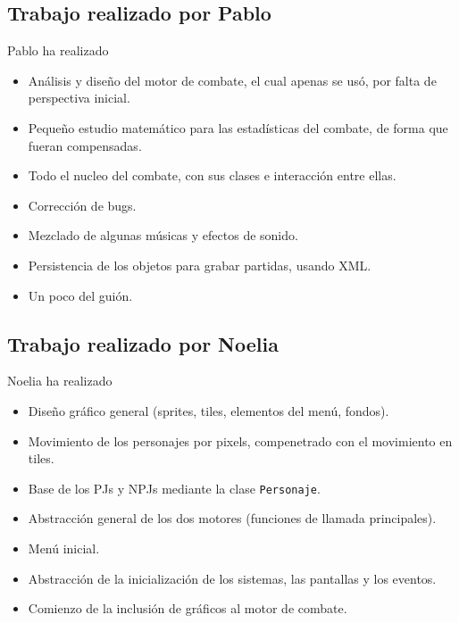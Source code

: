 \documentclass[9pt,xcolor=svgnames]{beamer}
\begin{document}
\subsection{Trabajo realizado por Pablo}
\begin{frame}{Pablo ha realizado}
  \transdissolve

  \begin{itemize}
  \item Análisis y diseño del motor de combate, el cual apenas se usó, por falta
    de perspectiva inicial.
  \item Pequeño estudio matemático para las estadísticas del combate, de
    forma que fueran compensadas.
  \item Todo el nucleo del combate, con sus clases e interacción entre ellas.
  \item Corrección de bugs.
  \item Mezclado de algunas músicas y efectos de sonido.
  \item Persistencia de los objetos para grabar partidas, usando XML.
  \item Un poco del guión.
  \end{itemize}
\end{frame}

\subsection{Trabajo realizado por Noelia}
\begin{frame}{Noelia ha realizado}
  \transdissolve

  \begin{itemize}
  \item Diseño gráfico general (sprites, tiles, elementos del menú,
	fondos).
  \item Movimiento de los personajes por pixels, compenetrado con el
	movimiento en tiles.
  \item Base de los PJs y NPJs mediante la clase \texttt{Personaje}.
  \item Abstracción general de los dos motores (funciones de llamada
	principales).
  \item Menú inicial.
  \item Abstracción de la inicialización de los sistemas, las pantallas
	y los eventos.
  \item Comienzo de la inclusión de gráficos al motor de combate.
  \end{itemize}
\end{frame}
\end{document}

